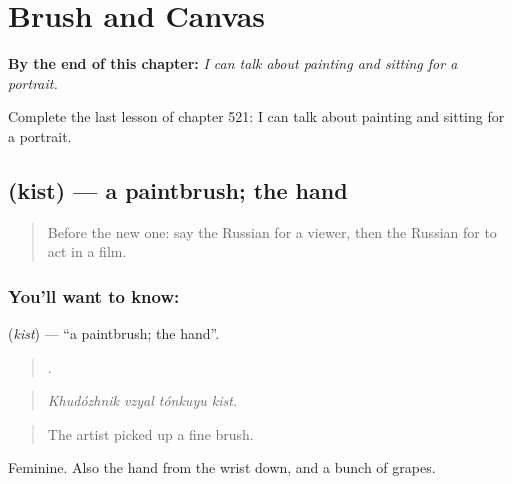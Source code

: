 
\chapter{Brush and Canvas}
\label{ch:ru-brush-and-canvas}

\begin{chapteropening}
\textbf{By the end of this chapter:} \emph{I can talk about painting and sitting for a portrait.}

Complete the last lesson of chapter 521: I can talk about painting and sitting for a portrait.
\end{chapteropening}

\section[\texorpdfstring{\ru{кисть} (kist)}{кисть (kist)}]{ (kist) — a paintbrush; the hand}

\label{lesson:RU-C521-kist}



\begin{quote}
Before the new one: say the Russian for a viewer, then the Russian for to act in a film.
\end{quote}

\subsection*{You'll want to know: }
\textbf{} (\emph{kist}) — \textquotedblleft{}a paintbrush; the hand\textquotedblright{}.

\begin{quote}
   .
\end{quote}

\begin{quote}
\emph{Khudózhnik vzyal tónkuyu kist.}
\end{quote}

\begin{quote}
The artist picked up a fine brush.
\end{quote}

Feminine. Also the hand from the wrist down, and a bunch of grapes.

